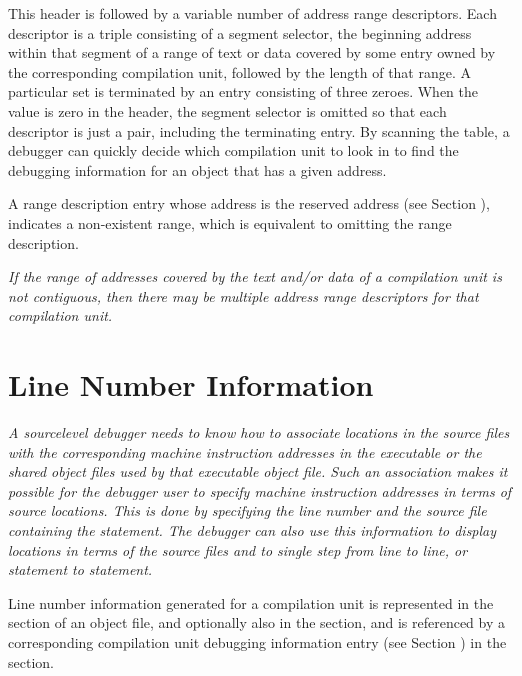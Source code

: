 This header is followed by a variable number of address range
descriptors. Each descriptor is a triple consisting of a
segment selector, the beginning address within that segment
of a range of text or data covered by some entry owned by
the corresponding compilation unit, followed by the 
\db
length of that range. A particular set is terminated by an
entry consisting of three zeroes. 
When the \HFNsegmentselectorsize{} value
is zero in the header, the segment selector is omitted so that
each descriptor is just a pair, including the terminating
entry. By scanning the table, a debugger can quickly decide
which compilation unit to look in to find the debugging
information for an object that has a given address.

\bb
A range description entry whose address is the reserved address (see
Section ), indicates a 
non-existent range, which is equivalent to
omitting the range description.
\eb

\textit{If the range of addresses covered by the text and/or data
of a compilation unit is not contiguous, then there may be
multiple address range descriptors for that compilation unit.}


\section{Line Number Information}
\label{chap:linenumberinformation}
\textit{A source\dash level debugger needs to know how to
associate locations in the source files with the corresponding
machine instruction addresses in the executable or the shared 
object files used by that executable object file. Such an
association makes it possible for the debugger user
to specify machine instruction addresses in terms of source
locations. This is done by specifying the line number
and the source file containing the statement. The debugger
can also use this information to display locations in terms
of the source files and to single step from line to line,
or statement to statement.}

Line number information generated for a compilation unit is
represented in the 
\dotdebugline{} section of an object file, and optionally
also in the \dotdebuglinestr{} section, and
is referenced by a corresponding compilation unit debugging
information entry 
(see Section ) 
in the \dotdebuginfo{} section.

